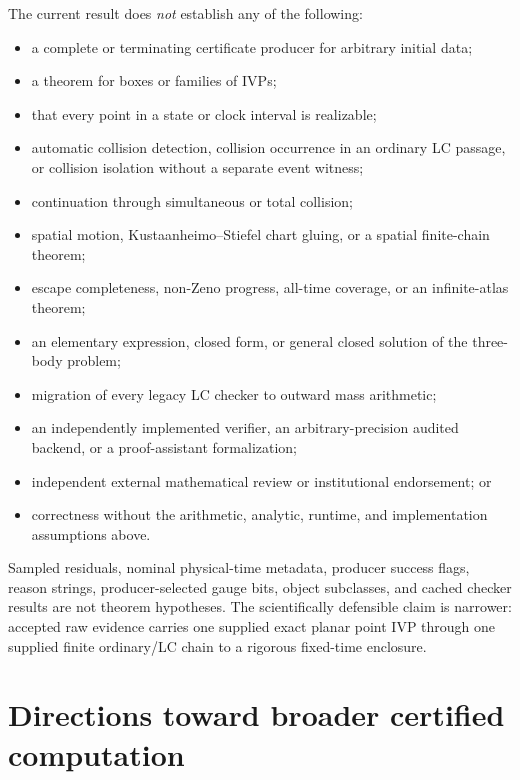 \documentclass[11pt]{article}
\begin{document}
The current result does \emph{not} establish any of the following:
\begin{itemize}
\item a complete or terminating certificate producer for arbitrary initial
      data;
\item a theorem for boxes or families of IVPs;
\item that every point in a state or clock interval is realizable;
\item automatic collision detection, collision occurrence in an ordinary LC
      passage, or collision isolation without a separate event witness;
\item continuation through simultaneous or total collision;
\item spatial motion, Kustaanheimo--Stiefel chart gluing, or a spatial
      finite-chain theorem;
\item escape completeness, non-Zeno progress, all-time coverage, or an
      infinite-atlas theorem;
\item an elementary expression, closed form, or general closed solution of
      the three-body problem;
\item migration of every legacy LC checker to outward mass arithmetic;
\item an independently implemented verifier, an arbitrary-precision audited
      backend, or a proof-assistant formalization;
\item independent external mathematical review or institutional endorsement;
      or
\item correctness without the arithmetic, analytic, runtime, and
      implementation assumptions above.
\end{itemize}

Sampled residuals, nominal physical-time metadata, producer success flags,
reason strings, producer-selected gauge bits, object subclasses, and cached
checker results are not theorem hypotheses.  The scientifically defensible
claim is narrower: accepted raw evidence carries one supplied exact planar
point IVP through one supplied finite ordinary/LC chain to a rigorous
fixed-time enclosure.

\section{Directions toward broader certified computation}
\end{document}
